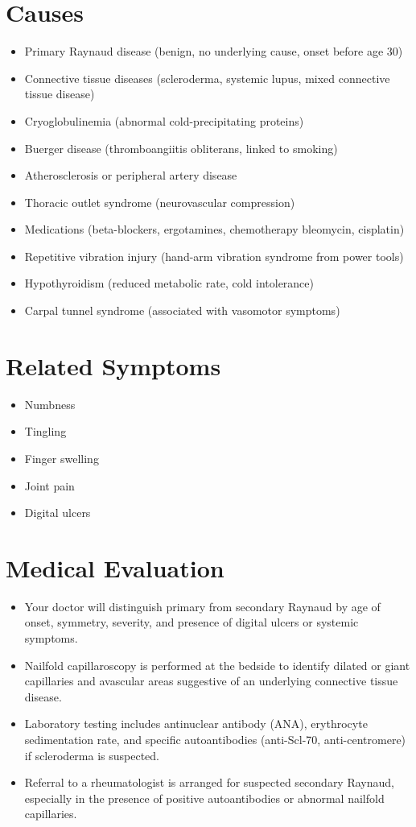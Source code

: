 \section*{Causes}
\begin{itemize}
  \item Primary Raynaud disease (benign, no underlying cause, onset before age 30)
  \item Connective tissue diseases (scleroderma, systemic lupus, mixed connective tissue disease)
  \item Cryoglobulinemia (abnormal cold-precipitating proteins)
  \item Buerger disease (thromboangiitis obliterans, linked to smoking)
  \item Atherosclerosis or peripheral artery disease
  \item Thoracic outlet syndrome (neurovascular compression)
  \item Medications (beta-blockers, ergotamines, chemotherapy bleomycin, cisplatin)
  \item Repetitive vibration injury (hand-arm vibration syndrome from power tools)
  \item Hypothyroidism (reduced metabolic rate, cold intolerance)
  \item Carpal tunnel syndrome (associated with vasomotor symptoms)
\end{itemize}

\section*{Related Symptoms}
\begin{itemize}
  \item Numbness
  \item Tingling
  \item Finger swelling
  \item Joint pain
  \item Digital ulcers
\end{itemize}

\section*{Medical Evaluation}
\begin{itemize}
  \item Your doctor will distinguish primary from secondary Raynaud by age of onset, symmetry, severity, and presence of digital ulcers or systemic symptoms.
  \item Nailfold capillaroscopy is performed at the bedside to identify dilated or giant capillaries and avascular areas suggestive of an underlying connective tissue disease.
  \item Laboratory testing includes antinuclear antibody (ANA), erythrocyte sedimentation rate, and specific autoantibodies (anti-Scl-70, anti-centromere) if scleroderma is suspected.
  \item Referral to a rheumatologist is arranged for suspected secondary Raynaud, especially in the presence of positive autoantibodies or abnormal nailfold capillaries.
\end{itemize}


